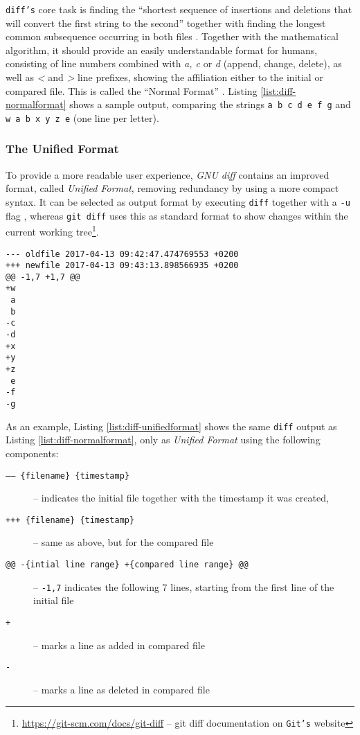 \texttt{diff's} core task is finding the ``shortest sequence of insertions and deletions that will convert the first string to the second'' \cite[1025]{miller1985file} together with finding the longest common subsequence occurring in both files \cite[2]{Hunt1976}. Together with the mathematical algorithm, it should provide an easily understandable format for humans, consisting of line numbers combined with \emph{a, c} or \emph{d} (append, change, delete), as well as \emph{<} and \emph{>} line prefixes, showing the affiliation either to the initial or compared file. This is called the ``Normal Format'' \cite[12]{mackenzie2003comparing}. Listing \ref{list:diff-normalformat} shows a sample output, comparing the strings \texttt{a b c d e f g} and \texttt{w a b x y z e} (one line per letter)\cite[p. 1f]{Hunt1976}.


\vspace{20pt}
\subsubsection{The Unified Format}

To provide a more readable user experience, \emph{GNU diff} contains an improved format, called \emph{Unified Format}, removing redundancy by using a more compact syntax. It can be selected as output format by executing \texttt{diff} together with a \texttt{-u} flag \cite[16]{mackenzie2003comparing}, whereas \texttt{git diff} uses this as standard format to show changes within the current working tree\footnote{\url{https://git-scm.com/docs/git-diff} -- git diff documentation on \texttt{Git's} website}.


\begin{lstlisting}[label={list:diff-unifiedformat}, caption=unified\_format.diff]
--- oldfile	2017-04-13 09:42:47.474769553 +0200
+++ newfile	2017-04-13 09:43:13.898566935 +0200
@@ -1,7 +1,7 @@
+w
 a
 b
-c
-d
+x
+y
+z
 e
-f
-g
\end{lstlisting}

As an example, Listing \ref{list:diff-unifiedformat} shows the same \texttt{diff} output as Listing \ref{list:diff-normalformat}, only as \emph{Unified Format} using the following components:

\begin{description}
  \item[\texttt{------ \{filename\} \{timestamp\}}] -- indicates the initial file together with the timestamp it was created,
  \item[\texttt{+++ \{filename\} \{timestamp\}}] -- same as above, but for the compared file
  \item[\texttt{@@ -\{intial line range\} +\{compared line range\} @@}] -- \texttt{-1,7} indicates the following 7 lines, starting from the first line of the initial file
  \item[\texttt{+}] -- marks a line as added in compared file
  \item[\texttt{-}] -- marks a line as deleted in compared file
\end{description}

